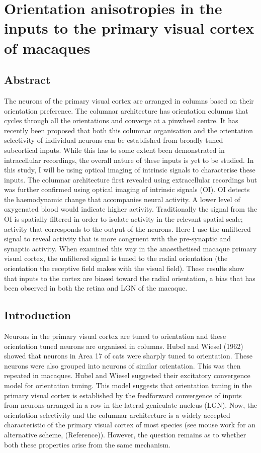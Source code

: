 
\chapter{Orientation anisotropies in the inputs to the primary visual cortex of macaques}

\pagebreak

	\section{Abstract}
	
			The neurons of the primary visual cortex are arranged in columns based on their orientation preference. The columnar architecture has orientation columns that cycles through all the orientations and converge at a pinwheel centre. It has recently been proposed that both this columnar organisation and the orientation selectivity of individual neurons can be established from broadly tuned subcortical inputs. While this has to some extent been demonstrated in intracellular recordings, the overall nature of these inputs is yet to be studied. In this study, I will be using optical imaging of intrinsic signals to characterise these inputs. The columnar architecture first revealed using extracellular recordings but was further confirmed using optical imaging of intrinsic signals (OI). OI detects the haemodynamic change that accompanies neural activity. A lower level of oxygenated blood would indicate higher activity. Traditionally the signal from the OI is spatially filtered in order to isolate activity in the relevant spatial scale; activity that corresponds to the output of the neurons. Here I use the unfiltered signal to reveal activity that is more congruent with the pre-synaptic and synaptic activity. When examined this way in the anaesthetised macaque primary visual cortex, the unfiltered signal is tuned to the radial orientation (the orientation the receptive field makes with the visual field). These results show that inputs to the cortex are biased toward the radial orientation, a bias that has been observed in both the retina and LGN of the macaque.
\pagebreak

	\section{Introduction}
	
	Neurons in the primary visual cortex are tuned to orientation and these orientation tuned neurons are organised in columns. Hubel and Wiesel (1962) showed that neurons in Area 17 of cats were sharply tuned to orientation. These neurons were also grouped into neurons of similar orientation. This was then repeated in macaques. Hubel and Wiesel suggested their excitatory convergence model for orientation tuning. This model suggests that orientation tuning in the primary visual cortex is established by the feedforward convergence of inputs from neurons arranged in a row in the lateral geniculate nucleus (LGN). Now, the orientation selectivity and the columnar architecture is a widely accepted characteristic of the primary visual cortex of most species (see mouse work for an alternative scheme, (Reference)). However, the question remains as to whether both these properties arise from the same mechanism.


